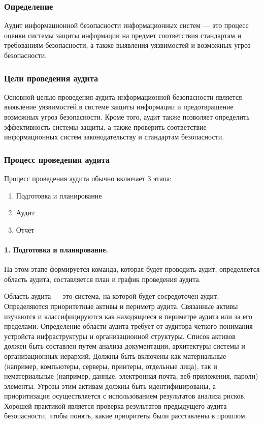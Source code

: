 \subsubsection{Определение}

Аудит информационной безопасности информационных систем — это процесс оценки системы защиты информации на предмет соответствия стандартам и требованиям безопасности, а также выявления уязвимостей и возможных угроз безопасности.

\subsubsection{Цели проведения аудита}

Основной целью проведения аудита информационной безопасности является выявление уязвимостей в системе защиты информации и предотвращение возможных угроз безопасности. Кроме того, аудит также позволяет определить эффективность системы защиты, а также проверить соответствие информационных систем законодательству и стандартам безопасности.

\subsubsection{Процесс проведения аудита}

Процесс проведения аудита обычно включает 3 этапа:
\begin{enumerate}
	\item Подготовка и планирование
	\item Аудит
	\item Отчет
\end{enumerate}

\paragraph{1. Подготовка и планирование.}

На этом этапе формируется команда, которая будет проводить аудит, определяется область аудита, составляется план и график проведения аудита.

Область аудита — это система, на которой будет сосредоточен аудит. Определяются приоритетные активы и периметр аудита. Связанные активы изучаются и классифицируются как находящиеся в периметре аудита или за его пределами. Определение области аудита требует от аудитора четкого понимания устройста инфраструктуры и организационной структуры. Список активов должен быть составлен путем анализа документации, архитектуры системы и организационных иерархий. Должны быть включены как материальные (например, компьютеры, серверы, принтеры, отдельные лица), так и нематериальные (например, данные, электронная почта, веб-приложения, пароли) элементы. Угрозы этим активам должны быть идентифицированы, а приоритизация осуществляется с использованием результатов анализа рисков. Хорошей практикой является проверка результатов предыдущего аудита безопасности, чтобы понять, какие приоритеты были расставлены в прошлом.

